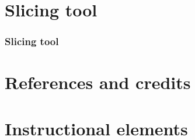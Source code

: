 \documentclass[utf8, english, usepdftitle=false, svgnames, color="table, fixpdftex,  fixinclude, xcdraw", t]{beamer}
\begin{document}
%
\part{Slicing tool}
\section{Slicing tool}




\backmatter{}
\part{References and credits}



\part{Instructional elements}


\end{document}
